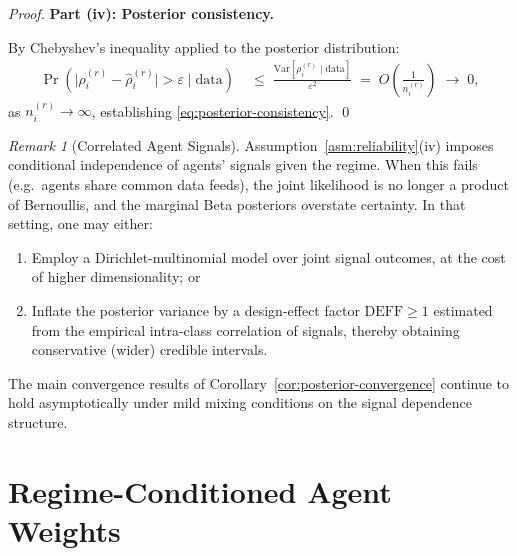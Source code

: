 \documentclass[12pt,openany]{book}
\numberwithin{equation}{chapter}
\theoremstyle{plain}
\theoremstyle{definition}
\theoremstyle{remark}
\newtheorem{remark}[theorem]{Remark}
\numberwithin{equation}{chapter}
\theoremstyle{plain}
\begin{document}
\begin{proof}
\medskip
\noindent\textbf{Part (iv): Posterior consistency.}

By Chebyshev's inequality applied to the posterior distribution:
\begin{align}
  \Pr\!\left(
    \bigl|\rho_i^{(r)} - \hat{\rho}_i^{(r)}\bigr| > \varepsilon
    \mid \mathrm{data}
  \right)
  &\;\leq\;
  \frac{
    \mathrm{Var}\!\left[\rho_i^{(r)}\mid\mathrm{data}\right]
  }{\varepsilon^2}
  \;=\;
  O\!\left(\frac{1}{n_i^{(r)}}\right)
  \;\longrightarrow\; 0,
  \label{eq:consistency-proof}
\end{align}
as $n_i^{(r)} \to \infty$, establishing
\eqref{eq:posterior-consistency}.
\qed
\end{proof}

\begin{remark}[Correlated Agent Signals]
\label{rem:correlated-agents}
Assumption~\ref{asm:reliability}(iv) imposes conditional
independence of agents' signals given the regime.  When this
fails (e.g.\ agents share common data feeds), the joint
likelihood is no longer a product of Bernoullis, and the
marginal Beta posteriors overstate certainty.  In that
setting, one may either:
\begin{enumerate}
  \item[\textup{(i)}] Employ a Dirichlet-multinomial model
        over joint signal outcomes, at the cost of higher
        dimensionality; or
  \item[\textup{(ii)}] Inflate the posterior variance by a
        design-effect factor $\mathrm{DEFF} \geq 1$ estimated
        from the empirical intra-class correlation of signals,
        thereby obtaining conservative (wider) credible intervals.
\end{enumerate}
The main convergence results of
Corollary~\ref{cor:posterior-convergence} continue to hold
asymptotically under mild mixing conditions on the signal
dependence structure.
\end{remark}

\section{Regime-Conditioned Agent Weights}
\end{document}
